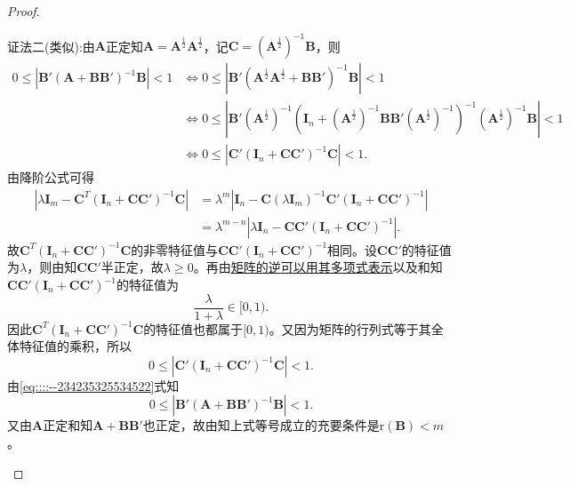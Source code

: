 \documentclass[../../main.tex]{subfiles}%
\begin{document}
\begin{proof}
\begin{enumerate}[(1)]
{\color{blue}证法二(类似):}由$\boldsymbol{A}$正定知$\boldsymbol{A} = \boldsymbol{A}^{\frac{1}{2}}\boldsymbol{A}^{\frac{1}{2}}$，记$\boldsymbol{C} = \left( \boldsymbol{A}^{\frac{1}{2}} \right)^{-1}\boldsymbol{B}$，则
\begin{align}
0 \leqslant \left| \boldsymbol{B}' \left( \boldsymbol{A} + \boldsymbol{BB}' \right)^{-1}\boldsymbol{B} \right| < 1
&\Longleftrightarrow 0 \leqslant \left| \boldsymbol{B}' \left( \boldsymbol{A}^{\frac{1}{2}}\boldsymbol{A}^{\frac{1}{2}} + \boldsymbol{BB}' \right)^{-1}\boldsymbol{B} \right| < 1 \nonumber \\
&\Longleftrightarrow 0 \leqslant \left| \boldsymbol{B}' \left( \boldsymbol{A}^{\frac{1}{2}} \right)^{-1} \left( \boldsymbol{I}_n + \left( \boldsymbol{A}^{\frac{1}{2}} \right)^{-1}\boldsymbol{BB}' \left( \boldsymbol{A}^{\frac{1}{2}} \right)^{-1} \right)^{-1} \left( \boldsymbol{A}^{\frac{1}{2}} \right)^{-1}\boldsymbol{B} \right| < 1 \nonumber \\
&\Longleftrightarrow 0 \leqslant \left| \boldsymbol{C}' \left( \boldsymbol{I}_n + \boldsymbol{CC}' \right)^{-1}\boldsymbol{C} \right| < 1. \label{eq::::--234235325534522}
\end{align}
由降阶公式可得
\begin{align*}
\left| \lambda \boldsymbol{I}_m - \boldsymbol{C}^{T} \left( \boldsymbol{I}_n + \boldsymbol{CC}' \right)^{-1}\boldsymbol{C} \right| &= \lambda^m \left| \boldsymbol{I}_n - \boldsymbol{C} \left( \lambda \boldsymbol{I}_m \right)^{-1}\boldsymbol{C}' \left( \boldsymbol{I}_n + \boldsymbol{CC}' \right)^{-1} \right| \\
&= \lambda^{m-n} \left| \lambda \boldsymbol{I}_n - \boldsymbol{CC}' \left( \boldsymbol{I}_n + \boldsymbol{CC}' \right)^{-1} \right|.
\end{align*}
故$\boldsymbol{C}^{T} \left( \boldsymbol{I}_n + \boldsymbol{CC}' \right)^{-1}\boldsymbol{C}$的非零特征值与$\boldsymbol{CC}' \left( \boldsymbol{I}_n + \boldsymbol{CC}' \right)^{-1}$相同。设$\boldsymbol{CC}'$的特征值为$\lambda$，则由知$\boldsymbol{CC}'$半正定，故$\lambda \geqslant 0$。再由\hyperref[proposition:矩阵的逆可以用其多项式表示]{矩阵的逆可以用其多项式表示}以及和知$\boldsymbol{CC}' \left( \boldsymbol{I}_n + \boldsymbol{CC}' \right)^{-1}$的特征值为
$$\frac{\lambda}{1 + \lambda} \in [0, 1).$$
因此$\boldsymbol{C}^{T} \left( \boldsymbol{I}_n + \boldsymbol{CC}' \right)^{-1}\boldsymbol{C}$的特征值也都属于$[0, 1)$。又因为矩阵的行列式等于其全体特征值的乘积，所以
$$0 \leqslant \left| \boldsymbol{C}' \left( \boldsymbol{I}_n + \boldsymbol{CC}' \right)^{-1}\boldsymbol{C} \right| < 1.$$
由\eqref{eq::::--234235325534522}式知
$$0 \leqslant \left| \boldsymbol{B}' \left( \boldsymbol{A} + \boldsymbol{BB}' \right)^{-1}\boldsymbol{B} \right| < 1.$$
又由$\boldsymbol{A}$正定和知$\boldsymbol{A} + \boldsymbol{BB}'$也正定，故由知上式等号成立的充要条件是$\mathrm{r}\left( \boldsymbol{B} \right) < m$。


\end{enumerate}
\end{proof}
\end{document}

